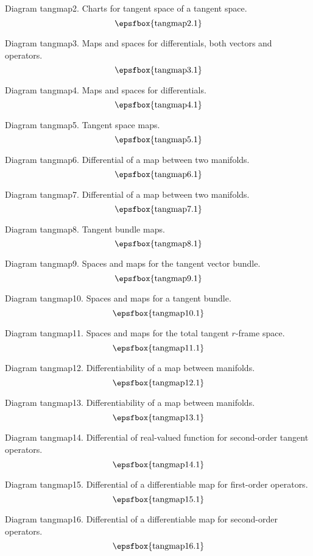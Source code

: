 Diagram tangmap2. Charts for tangent space of a tangent space.
$$
\centerline{\epsfbox{tangmap2.1}}
$$

Diagram tangmap3. Maps and spaces for differentials, both vectors and operators.
$$
\centerline{\epsfbox{tangmap3.1}}
$$

Diagram tangmap4. Maps and spaces for differentials.
$$
\centerline{\epsfbox{tangmap4.1}}
$$

\filleject

Diagram tangmap5. Tangent space maps.
$$
\centerline{\epsfbox{tangmap5.1}}
$$

Diagram tangmap6. Differential of a map between two manifolds.
$$
\centerline{\epsfbox{tangmap6.1}}
$$

Diagram tangmap7. Differential of a map between two manifolds.
$$
\centerline{\epsfbox{tangmap7.1}}
$$

Diagram tangmap8. Tangent bundle maps.
$$
\centerline{\epsfbox{tangmap8.1}}
$$

\filleject

Diagram tangmap9. Spaces and maps for the tangent vector bundle.
$$
\centerline{\epsfbox{tangmap9.1}}
$$

Diagram tangmap10. Spaces and maps for a tangent bundle.
$$
\centerline{\epsfbox{tangmap10.1}}
$$

Diagram tangmap11. Spaces and maps for the total tangent $r$-frame space.
$$
\centerline{\epsfbox{tangmap11.1}}
$$

Diagram tangmap12. Differentiability of a map between manifolds.
$$
\centerline{\epsfbox{tangmap12.1}}
$$

\filleject

Diagram tangmap13. Differentiability of a map between manifolds.
$$
\centerline{\epsfbox{tangmap13.1}}
$$

Diagram tangmap14. Differential of real-valued function for second-order tangent
operators.
$$
\centerline{\epsfbox{tangmap14.1}}
$$

Diagram tangmap15. Differential of a differentiable map for first-order
operators.
$$
\centerline{\epsfbox{tangmap15.1}}
$$

Diagram tangmap16. Differential of a differentiable map for second-order
operators.
$$
\centerline{\epsfbox{tangmap16.1}}
$$

